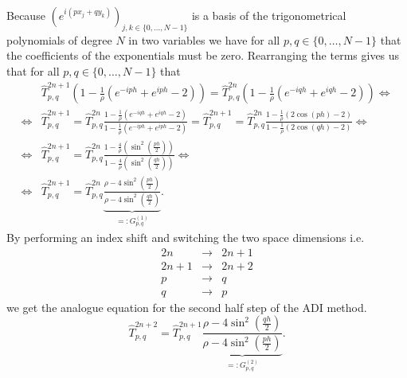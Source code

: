\documentclass[a4aper,pagesize]{scrartcl}
\theoremstyle{definition}
\theoremstyle{plain}
\theoremstyle{remark}
\renewcommand{\hat}{\widehat}
\begin{document}
Because $(e^{i(px_{j} + qy_{k})})_{j,k \in \{0, ..., N-1\}}$ is a basis of the trigonometrical polynomials of degree $N$ in two variables we have for all $p,q \in \{0, \dots, N-1\}$ that the coefficients of the exponentials must be zero. Rearranging the terms gives us that for all $p,q \in \{0, \dots, N-1\}$ that
\begin{align}
	&\hat{T}_{p,q}^{2n+1}
	\left(
		1
		-\frac{1}{\rho}\left(
			e^{-iph}
			+ e^{iph}
			- 2
		\right)
	\right)
	=
	\hat{T}_{p,q}^{2n}
	\left(
		1
		-\frac{1}{\rho}\left(
			e^{-iqh}
			+ e^{iqh}
			- 2
		\right)
	\right)
\Leftrightarrow\\
\Leftrightarrow&
	\hat{T}_{p,q}^{2n+1}
	=
	\hat{T}_{p,q}^{2n}
	\frac{
		1
		-\frac{1}{\rho}\left(
			e^{-iqh}
			+ e^{iqh}
			- 2
		\right)
	}{
		1
		-\frac{1}{\rho}\left(
			e^{-iph}
			+ e^{iph}
			- 2
		\right)
	}
	=
	\hat{T}_{p,q}^{2n+1}
	=
	\hat{T}_{p,q}^{2n}
	\frac{
		1-\frac{1}{\rho}(2\cos(ph)- 2)
	}{
		1-\frac{1}{\rho}(2\cos(qh)- 2)
	}
\Leftrightarrow\\
\Leftrightarrow&
	\hat{T}_{p,q}^{2n+1}
	=
	\hat{T}_{p,q}^{2n}
	\frac{
		1-\frac{4}{\rho}\left(\sin^2\left(\frac{ph}{2}\right)\right)
	}{
		1-\frac{4}{\rho}\left(\sin^2\left(\frac{qh}{2}\right)\right)
	}
\Leftrightarrow\\
\Leftrightarrow&
	\hat{T}_{p,q}^{2n+1}
	=
	\hat{T}_{p,q}^{2n}
	\underbrace{
		\frac{
			\rho-4\sin^2\left(\frac{ph}{2}\right)
		}{
			\rho-4\sin^2\left(\frac{qh}{2}\right)
		}
	}_{=:G_{p,q}^{(1)}}.
\end{align}
By performing an index shift and switching the two space dimensions i.e.
\begin{eqnarray*}
	2n &\rightarrow &2n+1\\
	2n+1 &\rightarrow &2n+2\\
	p &\rightarrow &q\\
	q &\rightarrow &p
\end{eqnarray*}
we get the analogue equation for the second half step of the ADI method.
\begin{equation}
	\hat{T}_{p,q}^{2n+2}
	=
	\hat{T}_{p,q}^{2n+1}
	\underbrace{
		\frac{
			\rho-4\sin^2\left(\frac{qh}{2}\right)
		}{
			\rho-4\sin^2\left(\frac{ph}{2}\right)
		}
	}_{=:G_{p,q}^{(2)}}.
\end{equation}
\end{document}
